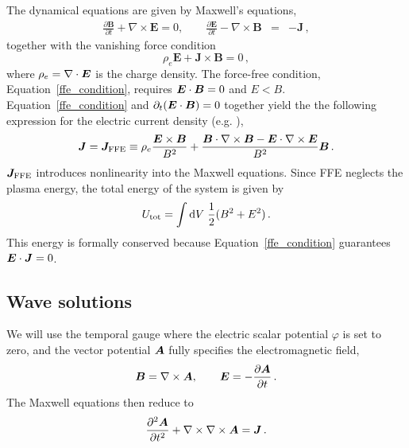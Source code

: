 The dynamical equations are given by Maxwell's equations,
%
\begin{eqnarray}\label{eq:Maxwell}
	\frac{\partial\boldsymbol{B}}{\partial t}+\nabla\times \boldsymbol{E} = 0,
    \qquad
	\frac{\partial\boldsymbol{E}}{\partial t}-\nabla\times \boldsymbol{B} &=& -\boldsymbol{J} \, ,
\end{eqnarray}
%
together with 
the vanishing force condition
%
\begin{equation}\label{ffe_condition}
	\rho_e \boldsymbol{E}+\boldsymbol{J}\times \boldsymbol{B} = 0 \, ,
\end{equation}
%
where $\rho_e=\nabla\cdot\boldsymbol{E}$ is the charge density. The force-free condition, Equation~\ref{ffe_condition}, requires $\boldsymbol{E} \cdot \boldsymbol{B} = 0$ and $E < B$.
Equation~\ref{ffe_condition} and $\partial_t(\boldsymbol{E} \cdot \boldsymbol{B}) = 0$ together yield the the following expression for the electric current density (e.g. \citet{2002MNRAS.336..759K}),
%
\begin{equation}\label{current}
	\boldsymbol{J}=\boldsymbol{J}_{\rm FFE} \equiv \rho_e \frac{\boldsymbol{E}\times\boldsymbol{B}}{B^2}+\frac{\boldsymbol{B}\cdot\nabla\times\boldsymbol{B}-\boldsymbol{E}\cdot\nabla\times\boldsymbol{E}}{B^2}\boldsymbol{B} \, .
\end{equation}
%
$\boldsymbol{J}_{\rm FFE}$ introduces nonlinearity into the Maxwell equations.
Since FFE neglects the plasma energy, the total energy of the system is given by
%
\begin{equation}
	U_{\rm tot} = \int\mathrm{d} V\;\frac{1}{2}(B^2+E^2) \, .
\end{equation}
%
This energy is formally conserved because Equation~\ref{ffe_condition} guarantees $\boldsymbol{E} \cdot \boldsymbol{J} = 0$.

\subsection{Wave solutions}
%
We will use the temporal gauge where the electric scalar potential $\varphi$ is set to zero, and the vector potential $\boldsymbol{A}$ fully specifies the electromagnetic field,
%
\begin{eqnarray}\label{potential}
	\boldsymbol{B} = \nabla\times \boldsymbol{A}, \qquad \boldsymbol{E} = - \frac{\partial \boldsymbol{A}}{\partial t} \, .
\end{eqnarray}
%
The Maxwell equations then reduce to 
%
\begin{equation}\label{reducedMax}
	\frac{\partial^2\boldsymbol{A}}{\partial t^2} + \nabla\times \nabla\times\boldsymbol{A} = \boldsymbol{J} \, .
\end{equation}
%

